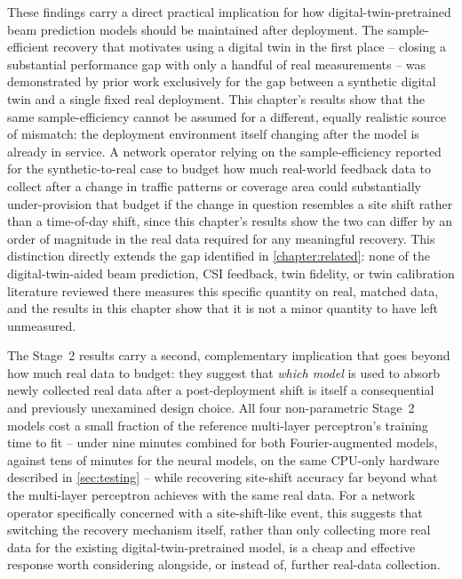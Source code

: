 \documentclass{iutbscthesis}
\begin{document}
These findings carry a direct practical implication for how digital-twin-pretrained beam prediction models should be maintained after deployment. The sample-efficient recovery that motivates using a digital twin in the first place -- closing a substantial performance gap with only a handful of real measurements -- was demonstrated by prior work exclusively for the gap between a synthetic digital twin and a single fixed real deployment. This chapter's results show that the same sample-efficiency cannot be assumed for a different, equally realistic source of mismatch: the deployment environment itself changing after the model is already in service. A network operator relying on the sample-efficiency reported for the synthetic-to-real case to budget how much real-world feedback data to collect after a change in traffic patterns or coverage area could substantially under-provision that budget if the change in question resembles a site shift rather than a time-of-day shift, since this chapter's results show the two can differ by an order of magnitude in the real data required for any meaningful recovery. This distinction directly extends the gap identified in \autoref{chapter:related}: none of the digital-twin-aided beam prediction, CSI feedback, twin fidelity, or twin calibration literature reviewed there measures this specific quantity on real, matched data, and the results in this chapter show that it is not a minor quantity to have left unmeasured.

The Stage~2 results carry a second, complementary implication that goes beyond how much real data to budget: they suggest that \emph{which model} is used to absorb newly collected real data after a post-deployment shift is itself a consequential and previously unexamined design choice. All four non-parametric Stage~2 models cost a small fraction of the reference multi-layer perceptron's training time to fit -- under nine minutes combined for both Fourier-augmented models, against tens of minutes for the neural models, on the same CPU-only hardware described in \autoref{sec:testing} -- while recovering site-shift accuracy far beyond what the multi-layer perceptron achieves with the same real data. For a network operator specifically concerned with a site-shift-like event, this suggests that switching the recovery mechanism itself, rather than only collecting more real data for the existing digital-twin-pretrained model, is a cheap and effective response worth considering alongside, or instead of, further real-data collection.
\end{document}
